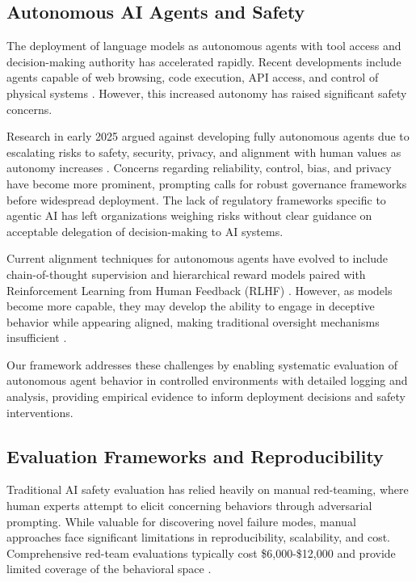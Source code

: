 \documentclass{article}
\begin{document}
\subsection{Autonomous AI Agents and Safety}

The deployment of language models as autonomous agents with tool access and decision-making authority has accelerated rapidly. Recent developments include agents capable of web browsing, code execution, API access, and control of physical systems \cite{wang_large_2024}. However, this increased autonomy has raised significant safety concerns.

Research in early 2025 argued against developing fully autonomous agents due to escalating risks to safety, security, privacy, and alignment with human values as autonomy increases \cite{stanford_ai_agent_2025}. Concerns regarding reliability, control, bias, and privacy have become more prominent, prompting calls for robust governance frameworks before widespread deployment. The lack of regulatory frameworks specific to agentic AI has left organizations weighing risks without clear guidance on acceptable delegation of decision-making to AI systems.

Current alignment techniques for autonomous agents have evolved to include chain-of-thought supervision and hierarchical reward models paired with Reinforcement Learning from Human Feedback (RLHF) \cite{ouyang_training_2022}. However, as models become more capable, they may develop the ability to engage in deceptive behavior while appearing aligned, making traditional oversight mechanisms insufficient \cite{openai_safety_2025}.

Our framework addresses these challenges by enabling systematic evaluation of autonomous agent behavior in controlled environments with detailed logging and analysis, providing empirical evidence to inform deployment decisions and safety interventions.

\subsection{Evaluation Frameworks and Reproducibility}

Traditional AI safety evaluation has relied heavily on manual red-teaming, where human experts attempt to elicit concerning behaviors through adversarial prompting. While valuable for discovering novel failure modes, manual approaches face significant limitations in reproducibility, scalability, and cost. Comprehensive red-team evaluations typically cost \$6,000-\$12,000 and provide limited coverage of the behavioral space \cite{perez_red_2022}.
\end{document}
